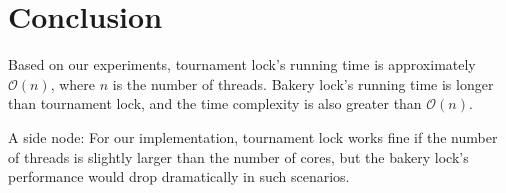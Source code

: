 \documentclass{article}
\newcommand*{\bigO}[1]{\ensuremath{\mathcal{O}\left(#1\right)}}
\begin{document}
\section*{Conclusion}

Based on our experiments, tournament lock's running time is approximately
\bigO{n}, where $n$ is the number of threads. Bakery lock's running time is
longer than tournament lock, and the time complexity is also greater than
\bigO{n}.

A side node: For our implementation, tournament lock works fine if the number
of threads is slightly larger than the number of cores, but the bakery lock's
performance would drop dramatically in such scenarios.
\end{document}
